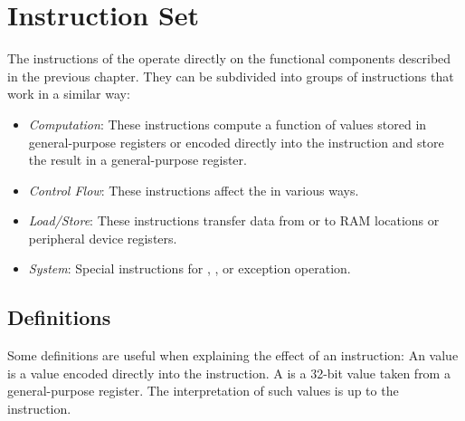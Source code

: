 \newcommand{\ldstformat}[1]{
Format:
\begin{tabular}{|c|c|c|c|c|}
\hline
Bits & 31..26 & 25..21 & 20..16 & 15..0\\
\hline
Value & #1 & x & r & y\\
\hline
\end{tabular}
}

\newcommand{\noargformat}[1]{
Format:
\begin{tabular}{|c|c|c|}
\hline
Bits & 31..26 & 25..0\\
\hline
Value & #1 & (ignored)\\
\hline
\end{tabular}
}

\newcommand{\mvspformat}[1]{
Format:
\begin{tabular}{|c|c|c|c|c|}
\hline
Bits & 31..26 & 25..21 & 20..16 & 15..0\\
\hline
Value & #1 & (ignored) & r & z\\
\hline
\end{tabular}
}

\chapter{Instruction Set}

The instructions of the \eco operate directly on the functional components described in the previous chapter. They can be subdivided into groups of instructions that work in a similar way:
\begin{itemize}
\item {\it Computation}: These instructions compute a function of values stored in general-purpose registers or encoded directly into the instruction and store the result in a general-purpose register.
\item {\it Control Flow}: These instructions affect the \pc in various ways.
\item {\it Load/Store}: These instructions transfer data from or to RAM locations or peripheral device registers.
\item {\it System}: Special instructions for \pswx, \mmux, or exception operation.
\end{itemize}

\section{Definitions}

Some definitions are useful when explaining the effect of an instruction: An  value is a value encoded directly into the instruction. A  is a 32-bit value taken from a general-purpose register. The interpretation of such values is up to the instruction.


